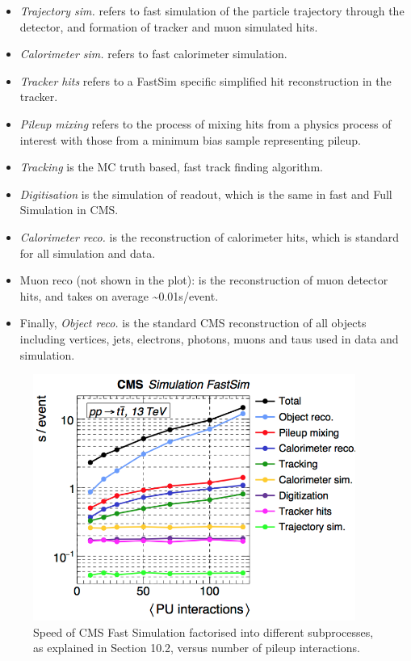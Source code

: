 \documentclass[12pt,a4paper]{article}
\begin{document}
{\begin{itemize}
\item
  \emph{Trajectory sim.} refers to fast simulation of the particle
  trajectory through the detector, and formation of tracker and muon
  simulated hits.
\item
  \emph{Calorimeter sim.} refers to fast calorimeter simulation.
\item
  \emph{Tracker hits} refers to a FastSim specific simplified hit
  reconstruction in the tracker.
\item
  \emph{Pileup mixing} refers to the process of mixing hits from a
  physics process of interest with those from a minimum bias sample
  representing pileup.
\item
  \emph{Tracking} is the MC truth based, fast track finding algorithm.
\item
  \emph{Digitisation} is the simulation of readout, which is the same in
  fast and Full Simulation in CMS.
\item
  \emph{Calorimeter reco.} is the reconstruction of calorimeter hits,
  which is standard for all simulation and data.
\item
  Muon reco (not shown in the plot): is the reconstruction of muon
  detector hits, and takes on average \textasciitilde{}0.01s/event.
\item
  Finally, \emph{Object reco.} is the standard CMS reconstruction of all
  objects including vertices, jets, electrons, photons, muons and taus
  used in data and simulation.
\end{itemize}

\begin{figure}[bthp]
\vspace*{0.3cm}
\centering
\includegraphics[width=0.94\textwidth]{image25.png}
\caption{Speed of CMS Fast Simulation factorised into different
subprocesses, as explained in Section 10.2, versus number of pileup
interactions. }
\label{fig:speedfastsim}
\end{figure}

}
\end{document}
